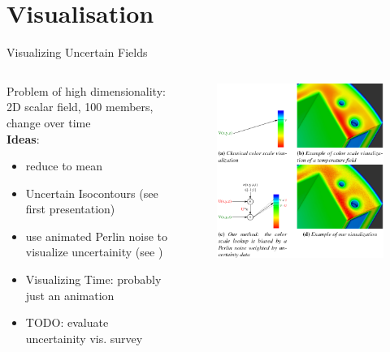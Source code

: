 \section{Visualisation}
\begin{frame}{Visualizing Uncertain Fields}
\begin{columns}
      \begin{column}{.6 \textwidth}
Problem of high dimensionality: 2D scalar field, 100 members, change over time \\ 
\textbf{Ideas}:
         \begin{itemize}
           \item reduce to mean 
           \item Uncertain Isocontours (see first presentation)
           \item use animated Perlin noise to visualize uncertainity (see \citeauthor{coninx_visualization_2011} \cite{coninx_visualization_2011})
           \item Visualizing Time: probably just an animation
           \item TODO: evaluate uncertainity vis. survey \cite{kamal_recent_2021}
         \end{itemize}
        
      \end{column}
      \begin{column}{.4 \textwidth}
    \begin{figure}[t]
      \centering
      \includegraphics[width=.8 \columnwidth]{imglib/perlin_noise.png}
    \end{figure}
        
      \end{column}
    \end{columns}

\end{frame}
